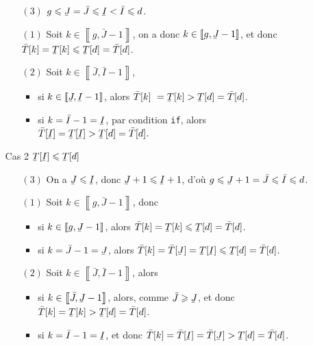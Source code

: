 \begin{prv}
\begin{itemize}
\begin{itemize}
					\begin{itemize}
						\item[$(3)$] $g \le \ubar{J} = \bar{J} \le \ubar{I} < \bar{I} \le d$.
						\item[$(1)$] Soit $k \in \left\llbracket g, \bar{J} - 1 \right\rrbracket$, on a donc $k \in \left\llbracket g, \ubar{J} - 1 \right\rrbracket$, et donc $\bar{T}[k] = \ubar{T}[k] \le \ubar{T}[d] = \bar{T}[d]$.
						\item[$(2)$] Soit $k \in \left\llbracket \bar{J}, \bar{I} - 1 \right\rrbracket$,
							\begin{itemize}
								\item si $k \in \left\llbracket \ubar{J}, \ubar{I} - 1 \right\rrbracket$, alors $\bar{T}[k] = \ubar{T}[k] > \ubar{T}[d] = \bar{T}[d]$.
								\item si $k = \bar{I} - 1 = \ubar{I}$, par condition {\tt if}, alors $\bar{T}[\ubar{I}] = \ubar{T}[\ubar{I}] > \ubar{T}[d] = \bar{T}[d]$.
							\end{itemize}
					\end{itemize}
				\item[{\sc Cas 2}] $\ubar{T}[\ubar{I}] \le \ubar{T}[d]$\/ 
					\begin{itemize}
						\item[$(3)$] On a $\ubar{J} \le \ubar{I}$, donc $\ubar{J} + 1 \le \ubar{I} + 1$, d'où $g \le \ubar{J} + 1 = \bar{J} \le \bar{I} \le d$.
						\item[$(1)$] Soit $k \in \left\llbracket g, \bar{J} - 1 \right\rrbracket$, donc
							\begin{itemize}
								\item si $k \in \left\llbracket g, \ubar{J} - 1 \right\rrbracket$, alors $\bar{T}[k] = \ubar{T}[k] \le \ubar{T}[d] = \bar{T}[d]$.
								\item si $k = \bar{J} - 1 = \ubar{J}$, alors $\bar{T}[k] = \bar{T}[\ubar{J}] = \ubar{T}[\ubar{I}] \le \ubar{T}[d] = \bar{T}[d]$.
							\end{itemize}
						\item[$(2)$] Soit $k \in \left\llbracket \bar{J}, \bar{I} - 1 \right\rrbracket$, alors
							\begin{itemize}
								\item si $k \in \left\llbracket \bar{J}, \ubar{J} - 1 \right\rrbracket$, alors, comme $\bar{J} \ge  \ubar{J}$, et donc $\bar{T}[k] = \ubar{T}[k] > \ubar{T}[d] = \bar{T}[d]$.
								\item si $k = \bar{I} - 1 = \ubar{I}$, et donc $\bar{T}[k] = \bar{T}[\ubar{I}] = \bar{T}[\ubar{J}] > \ubar{T}[d] = \bar{T}[d]$.
							\end{itemize}
					\end{itemize}
			\end{itemize}
	\end{itemize}


\end{prv}
